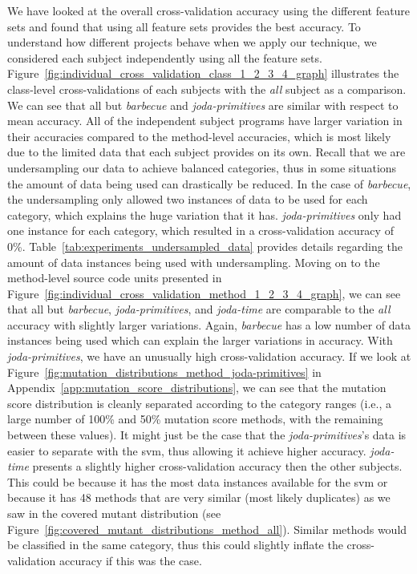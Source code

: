 We have looked at the overall cross-validation accuracy using the different feature sets and found that using all feature sets provides the best accuracy. To understand how different projects behave when we apply our technique, we considered each subject independently using all the feature sets. Figure~\ref{fig:individual_cross_validation_class_1_2_3_4_graph} illustrates the class-level cross-validations of each subjects with the \emph{all} subject as a comparison. We can see that all but \emph{barbecue} and \emph{joda-primitives} are similar with respect to mean accuracy. All of the independent subject programs have larger variation in their accuracies compared to the method-level accuracies, which is most likely due to the limited data that each subject provides on its own. Recall that we are undersampling our data to achieve balanced categories, thus in some situations the amount of data being used can drastically be reduced. In the case of \emph{barbecue}, the undersampling only allowed two instances of data to be used for each category, which explains the huge variation that it has. \emph{joda-primitives} only had one instance for each category, which resulted in a cross-validation accuracy of 0\%. Table~\ref{tab:experiments_undersampled_data} provides details regarding the amount of data instances being used with undersampling. Moving on to the method-level source code units presented in Figure~\ref{fig:individual_cross_validation_method_1_2_3_4_graph}, we can see that all but \emph{barbecue}, \emph{joda-primitives}, and \emph{joda-time} are comparable to the \emph{all} accuracy with slightly larger variations. Again, \emph{barbecue} has a low number of data instances being used which can explain the larger variations in accuracy. With \emph{joda-primitives}, we have an unusually high cross-validation accuracy. If we look at Figure~\ref{fig:mutation_distributions_method_joda-primitives} in Appendix~\ref{app:mutation_score_distributions}, we can see that the mutation score distribution is cleanly separated according to the category ranges (i.e., a large number of 100\% and 50\% mutation score methods, with the remaining between these values). It might just be the case that the \emph{joda-primitives}'s data is easier to separate with the \gls{svm}, thus allowing it achieve higher accuracy. \emph{joda-time} presents a slightly higher cross-validation accuracy then the other subjects. This could be because it has the most data instances available for the \gls{svm} or because it has 48 methods that are very similar (most likely duplicates) as we saw in the covered mutant distribution (see Figure~\ref{fig:covered_mutant_distributions_method_all}). Similar methods would be classified in the same category, thus this could slightly inflate the cross-validation accuracy if this was the case.


